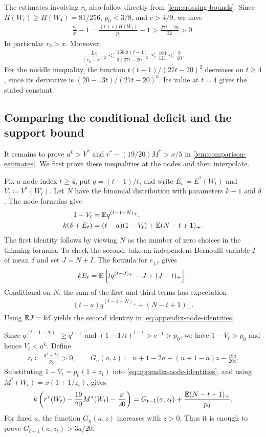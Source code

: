 The estimates involving $r_b$ also follow directly from \cref{lem:crossing-bounds}. Since $H(W_t)\ge H(W_4)=81/256$, $p_0<3/8$, and $c>4/9$, we have
\begin{align*}
\frac{r_b}{x}-1
=\frac{(t+c)H(W_t)}{p_0}-1
>\frac{27t-20}{32}>0.
\end{align*}
In particular $r_b>x$. Moreover,
\begin{align}\label{eq:appendix-rb-ratio}
\frac{Lx}{(r_b-x)^2}
<\frac{1664t(t-1)}{3(27t-20)^2}
\le\frac{104}{121}<\frac9{10}.
\end{align}
For the middle inequality, the function $t(t-1)/(27t-20)^2$ decreases on $t\ge4$, since its derivative is $(20-13t)/(27t-20)^3$. Its value at $t=4$ gives the stated constant.

\subsection{Comparing the conditional deficit and the support bound}

It remains to prove $a^k>V^*$ and $r^*-(19/20)M^*>x/5$ in \cref{lem:comparison-estimates}. We first prove these inequalities at the nodes and then interpolate.

Fix a node index $t\ge4$, put $q=(t-1)/t$, and write $E_t\coloneqq E^*(W_t)$ and $V_t\coloneqq V^*(W_t)$. Let $N$ have the binomial distribution with parameters $k-1$ and $\delta$. The node formulas give
\begin{align}\label{eq:appendix-node-identities}
1-V_t&=\mathbb E q^{(t-1-N)_+},\\
k(\delta+E_t)&=(t-a)(1-V_t)+\mathbb E(N-t+1)_+.\nonumber
\end{align}
The first identity follows by viewing $N$ as the number of zero choices in the thinning formula. To check the second, take an independent Bernoulli variable $I$ of mean $\delta$ and set $J=N+I$. The formula for $e_{j,t}$ gives
\begin{align*}
kE_t=\mathbb E\left[tq^{(t-J)_+}-J+(J-t)_+\right].
\end{align*}
Conditional on $N$, the sum of the first and third terms has expectation
\begin{align*}
(t-a)q^{(t-1-N)_+}+(N-t+1)_+.
\end{align*}
Using $\mathbb E J=k\delta$ yields the second identity in \cref{eq:appendix-node-identities}.

Since $q^{(t-1-N)_+}\ge q^{t-1}$ and $(1-1/t)^{t-1}>\mathrm e^{-1}>p_0$, we have $1-V_t>p_0$ and hence $V_t<a^k$. Define
\begin{align*}
z_t\coloneqq\frac{a^k-V_t}{p_0}>0,\qquad
G_n(a,z)\coloneqq n+1-2a+(n+1-a)z-\frac{19a}{20z}.
\end{align*}
Substituting $1-V_t=p_0(1+z_t)$ into \cref{eq:appendix-node-identities}, and using $M^*(W_t)=x(1+1/z_t)$, gives
\begin{align}\label{eq:appendix-target-reduction}
k\left(r^*(W_t)-\frac{19}{20}M^*(W_t)-\frac{x}{20}\right)
=G_{t-1}(a,z_t)+\frac{\mathbb E(N-t+1)_+}{p_0}.
\end{align}
For fixed $a$, the function $G_n(a,z)$ increases with $z>0$. Thus it is enough to prove $G_{t-1}(a,z_t)>3a/20$.

